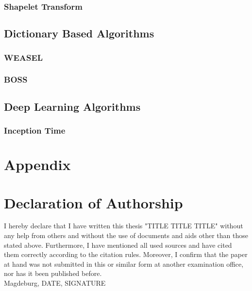 \subsubsection{Shapelet Transform}


\subsection{Dictionary Based Algorithms}

\subsubsection{WEASEL}

\subsubsection{BOSS}


\subsection{Deep Learning Algorithms}

\subsubsection{Inception Time}

\null\newpage


\section{Appendix}

\null\newpage

% 
\printbibliography
\newpage

\section{Declaration of Authorship}
I hereby declare that I have written this thesis "TITLE TITLE TITLE"
without any help from others and without the use of documents and aids
other than those stated above. Furthermore, I have mentioned all used
sources and have cited them correctly according to the citation rules.
Moreover, I confirm that the paper at hand was not submitted in this or
similar form at another examination office, nor has it been published
before.
\\
Magdeburg, DATE, SIGNATURE